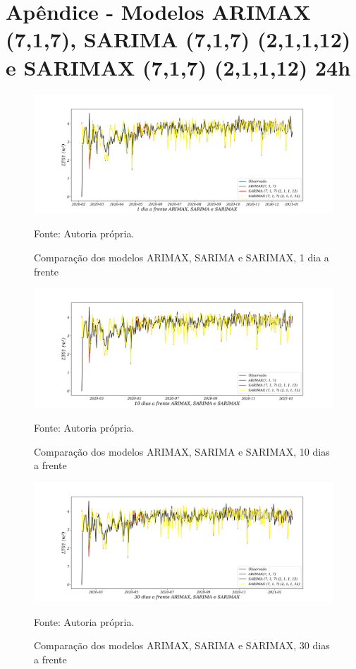 
\section{Apêndice - Modelos ARIMAX (7,1,7), SARIMA (7,1,7) (2,1,1,12) e SARIMAX (7,1,7) (2,1,1,12) 24h}\label{sec:arimaxsarimasarimax24}

\begin{figure}[H]
	\centering
	\caption{Comparação dos modelos ARIMAX, SARIMA e SARIMAX, 1 dia a frente }
	\label{fig:1-ARIMAX-SARIMA-SARIMAX24}
	\includegraphics[width=1\linewidth]{Apendices/Figuras/modelagem-24h/1-ARIMAX-SARIMA-SARIMAX}
	
	Fonte: Autoria própria.
\end{figure}

\begin{figure}[H]
	\centering
	\caption{Comparação dos modelos ARIMAX, SARIMA e SARIMAX, 10 dias a frente }
	\label{fig:10-ARIMAX-SARIMA-SARIMAX24}
	\includegraphics[width=1\linewidth]{Apendices/Figuras/modelagem-24h/10-ARIMAX-SARIMA-SARIMAX}
	
	Fonte: Autoria própria.
\end{figure}


\begin{figure}[H]
	\centering
	\caption{Comparação dos modelos ARIMAX, SARIMA e SARIMAX, 30 dias a frente }
	\label{fig:30-ARIMAX-SARIMA-SARIMAX24}
	\includegraphics[width=1\linewidth]{Apendices/Figuras/modelagem-24h/30-ARIMAX-SARIMA-SARIMAX}
	
	Fonte: Autoria própria.
\end{figure}

